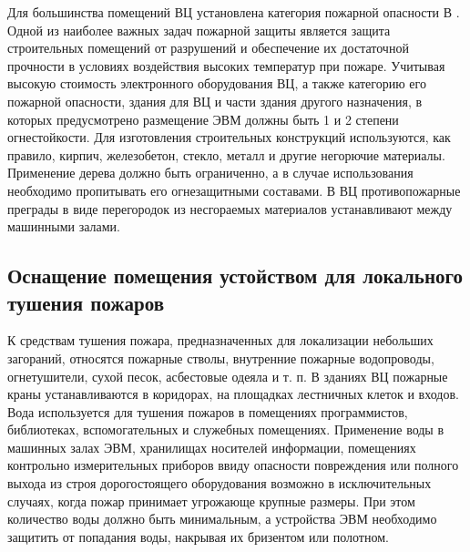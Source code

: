 Для большинства помещений ВЦ установлена категория пожарной опасности В \cite{npb10503}. Одной из наиболее важных задач пожарной защиты
является защита строительных помещений от разрушений и обеспечение их достаточной прочности в условиях воздействия
высоких температур при пожаре. Учитывая высокую стоимость электронного оборудования ВЦ, а также категорию его
пожарной опасности, здания для ВЦ и части здания другого назначения, в которых предусмотрено размещение ЭВМ должны
быть 1 и 2 степени огнестойкости. Для изготовления строительных конструкций используются, как правило, кирпич,
железобетон, стекло, металл и другие негорючие материалы. Применение дерева должно быть ограниченно, а в
случае использования необходимо пропитывать его огнезащитными составами. В ВЦ противопожарные преграды в виде
перегородок из несгораемых материалов устанавливают между машинными залами.

\subsection{Оснащение помещения устойством для локального тушения пожаров}

К средствам тушения пожара, предназначенных для локализации небольших загораний, относятся пожарные стволы,
внутренние пожарные водопроводы, огнетушители, сухой песок, асбестовые одеяла и т. п. В зданиях ВЦ пожарные
краны устанавливаются в коридорах, на площадках лестничных клеток и входов. Вода используется для тушения пожаров
в помещениях программистов, библиотеках, вспомогательных и служебных помещениях. Применение воды в машинных залах
ЭВМ, хранилищах носителей информации, помещениях контрольно измерительных приборов ввиду опасности повреждения или
полного выхода из строя дорогостоящего оборудования возможно в исключительных случаях, когда пожар принимает
угрожающе крупные размеры. При этом количество воды должно быть минимальным, а устройства ЭВМ необходимо защитить
от попадания воды, накрывая их бризентом или полотном.

